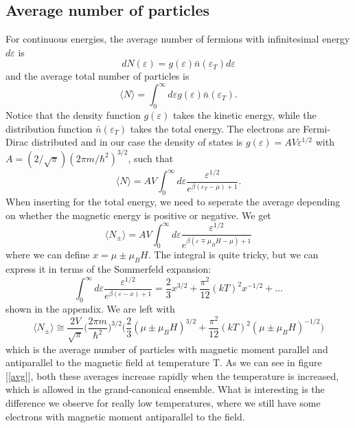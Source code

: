\documentclass[norsk,a4paper,12pt]{article}
\begin{document}
\subsection{Average number of particles}
For continuous energies, the average number of fermions with infinitesimal energy $d\varepsilon$ is
\begin{equation}
dN(\varepsilon)=g(\varepsilon)\bar{n}(\varepsilon_T)d\varepsilon
\end{equation}
and the average total number of particles is 
\begin{equation}
\langle N\rangle=\int_0^{\infty}d\varepsilon g(\varepsilon)\bar{n}(\varepsilon_T).
\end{equation}
Notice that the density function $g(\varepsilon)$ takes the kinetic energy, while the distribution function $\bar{n}(\varepsilon_T)$ takes the total energy. The electrons are Fermi-Dirac distributed and in our case the density of states is
$g(\varepsilon)=AV\varepsilon^{1/2}$ with $A=(2/\sqrt{\pi})(2\pi m/\hbar^2)^{3/2}$, such that 
\begin{equation}
\langle N\rangle=AV\int_0^{\infty}d\varepsilon\frac{\varepsilon^{1/2}}{e^{\beta(\varepsilon_T-\mu)+1}}.
\end{equation}
When inserting for the total energy, we need to seperate the average depending on whether the magnetic energy is positive or negative. We get
\begin{equation}
\langle N_{\pm}\rangle=AV\int_0^{\infty}d\varepsilon\frac{\varepsilon^{1/2}}{e^{\beta(\varepsilon\mp\mu_BH-\mu)+1}}
\end{equation}
where we can define $x=\mu\pm\mu_BH$. The integral is quite tricky, but we can express it in terms of the Sommerfeld expansion:
\begin{equation}
\int_0^{\infty}d\varepsilon\frac{\varepsilon^{1/2}}{e^{\beta(\varepsilon-x)+1}}=\frac{2}{3}x^{3/2}+\frac{\pi^2}{12}(kT)^2x^{-1/2}+\hdots
\end{equation}
shown in the appendix. We are left with
\begin{equation}
\langle N_{\pm}\rangle\cong\frac{2V}{\sqrt{\pi}}\bigg(\frac{2\pi m}{\hbar^2}\bigg)^{3/2}\bigg(\frac{2}{3}(\mu\pm\mu_BH)^{3/2}+\frac{\pi^2}{12}(kT)^2(\mu\pm\mu_BH)^{-1/2}\bigg)
\end{equation}
which is the average number of particles with magnetic moment parallel and antiparallel to the magnetic field at temperature T. As we can see in figure [\ref{avg}], both these averages increase rapidly when the temperature is increased, which is allowed in the grand-canonical ensemble. What is interesting is the difference we observe for really low temperatures, where we still have some electrons with magnetic moment antiparallel to the field. 
\end{document}
